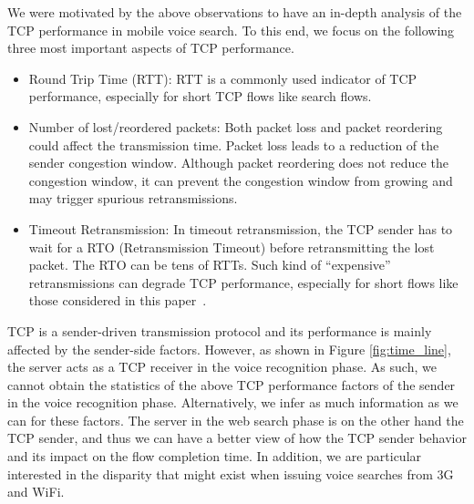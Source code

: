 

We were motivated by the above observations to have an in-depth analysis of the TCP performance in mobile voice search. To this end, we focus on the following three most important aspects of TCP performance.

\begin{itemize}
	\item {Round Trip Time (RTT):} RTT is a commonly used indicator of TCP performance, especially for short TCP flows like search flows.
	
	\item {Number of lost/reordered packets:} Both packet loss and packet reordering could affect the transmission time. Packet loss leads to a reduction of the sender congestion window. Although packet reordering does not reduce the congestion window, it can prevent the congestion window from growing and may trigger spurious retransmissions.
	
	\item {Timeout Retransmission:} In timeout retransmission, the TCP sender has to wait for a RTO (Retransmission Timeout) before retransmitting the lost packet. The RTO can be tens of RTTs. Such kind of ``expensive'' retransmissions can degrade TCP performance, especially for short flows like those considered in this paper~\cite{flach2013reducing}.

\end{itemize}

TCP is a sender-driven transmission protocol and its performance is mainly affected by the sender-side factors. However, as shown in Figure \ref{fig:time_line}, the server acts as a TCP receiver in the voice recognition phase. As such, we cannot obtain the statistics of the above TCP performance factors of the sender in the voice recognition phase. Alternatively, we infer as much information as we can for these factors. The server in the web search phase is on the other hand the TCP sender, and thus we can have a better view of how the TCP sender behavior and its impact on the flow completion time. In addition, we are particular interested in the disparity that might exist when issuing voice searches from 3G and WiFi. 
